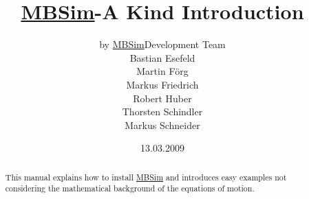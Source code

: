 \documentclass[a4,english]{AMpaper}
\newcommand{\MBSim}{\href{http://mbsim.berlios.de}{\textsf{MBSim}}}
\begin{document}
\title{\MBSim-A Kind Introduction}
\author{by \MBSim Development Team\\
  Bastian Esefeld\\
  Martin F\"org\\
  Markus Friedrich\\
  Robert Huber\\
  Thorsten Schindler\\
  Markus Schneider}
\date{13.03.2009}
\maketitle

\begin{abstract}
  This manual explains how to install \MBSim{} and introduces easy examples not considering the mathematical background of the equations of motion.
\end{abstract}

\noindent\hrulefill
\tableofcontents



%

%
%
%




\end{document}
